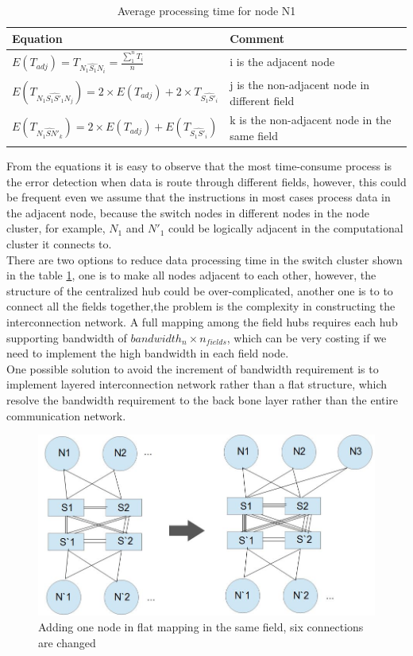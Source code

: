 \documentclass[11pt,openright,a4paper]{report}
\begin{document}
\begin{table}[H]
\centering
\caption{Average processing time for node N1}
\label{tab:n1proc}
\begin{tabular}{@{}ll@{}}
\toprule
Equation                                                                                          & Comment                                       \\ \midrule
$E(T_{adj})=T_{\widehat{N_{1}S_{1}N_{i}}}=\frac{\sum_{1}^{n}T_{i}}{n}$                            & i is the adjacent node                        \\
$E(T_{\widehat{N_{1}S_{1}{S}'_{1}N_{j}}})=2\times E(T_{adj})+2\times T_{\widehat{S_{1}{S}'_{i}}}$ & j is the non-adjacent node in different field  \\
$E(T_{\widehat{N_{1}S{N}'_{k}}})=2\times E(T_{adj})+E(T_{\widehat{S_{1}{S}'_{i}}})$          & k is the non-adjacent node in the same field \\ \bottomrule
\end{tabular}
\end{table}
From the equations it is easy to observe that the most time-consume process is the error detection when data is route through different fields, however, this could be frequent even we assume that the instructions in most cases process data in the adjacent node, because the switch nodes in different nodes in the node cluster, for example, $N_{1}$ and ${N}'_{1}$ could be logically adjacent in the computational cluster it connects to.\\
There are two options to reduce data processing time in the switch cluster shown in the table \ref{tab:n1proc}, one is to make all nodes adjacent to each other, however, the structure of the centralized hub could be over-complicated, another one is to to connect all the fields together,the problem is the complexity in constructing the interconnection network. A full mapping among the field hubs requires each hub supporting bandwidth of $bandwidth_{n}\times n_{fields}$, which can be very costing if we need to implement the high bandwidth in each field node.\\
One possible solution to avoid the increment of bandwidth requirement is to implement layered interconnection network rather than a flat structure, which resolve the bandwidth requirement to the back bone layer rather than the entire communication network. \\
\begin{figure}[H]
	\centering
    \includegraphics[width=0.5\linewidth]{picture/flat_addNode.JPG}
    \caption{Adding one node in flat mapping in the same field, six connections are changed}
    \label{fig:flatadd}
\end{figure}
\end{document}
